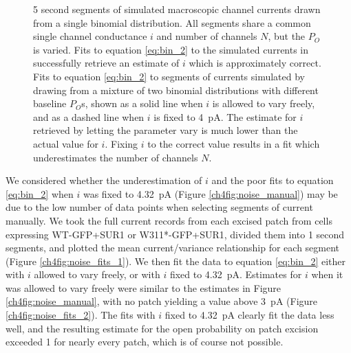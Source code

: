 \begin{figure}[hbtp]
\begin{subfigure}[t]{0.3\textwidth}
	\end{subfigure}
	\caption[Simulated multibinomial currents]{
	{\bf{}}
	 5 second segments of simulated macroscopic channel currents drawn from a single binomial distribution.
	All segments share a common single channel conductance $i$ and number of channels $N$, but the $P_O$ is varied.
	 Fits to equation \ref{eq:bin_2} to the simulated currents in  successfully retrieve an estimate of $i$ which is approximately correct.
	 Fits to equation \ref{eq:bin_2} to segments of currents simulated by drawing from a mixture of two binomial distributions with different baseline $P_O$s, shown as a solid line when $i$ is allowed to vary freely, and as a dashed line when $i$ is fixed to \SI{4}{\pico\ampere}.
	The estimate for $i$ retrieved by letting the parameter vary is much lower than the actual value for $i$.
	Fixing $i$ to the correct value results in a fit which underestimates the number of channels $N$.
	}\label{ch4fig:noise_sim}
\end{figure}

We considered whether the underestimation of $i$ and the poor fits to equation \ref{eq:bin_2} when $i$ was fixed to \SI{4.32}{\pico\ampere} (Figure \ref{ch4fig:noise_manual}) may be due to the low number of data points when selecting segments of current manually.
We took the full current records from each excised patch from cells expressing WT-GFP+SUR1 or W311*-GFP+SUR1, divided them into 1 second segments, and plotted the mean current/variance relationship for each segment (Figure \ref{ch4fig:noise_fits_1}).
We then fit the data to equation \ref{eq:bin_2} either with $i$ allowed to vary freely, or with $i$ fixed to \SI{4.32}{\pico\ampere}.
Estimates for $i$ when it was allowed to vary freely were similar to the estimates in Figure \ref{ch4fig:noise_manual}, with no patch yielding a value above \SI{3}{\pico\ampere} (Figure \ref{ch4fig:noise_fits_2}).
The fits with $i$ fixed to \SI{4.32}{\pico\ampere} clearly fit the data less well, and the resulting estimate for the open probability on patch excision exceeded 1 for nearly every patch, which is of course not possible.

